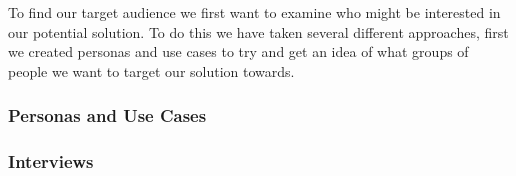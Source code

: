 To find our target audience we first want to examine who might be interested in our potential solution. To do this we have taken several different approaches, first we created personas and use cases to try and get an idea of what groups of people we want to target our solution towards.
\subsubsection{Personas and Use Cases}
\label{UseCases}

\subsubsection{Interviews}
\label{AudInterview}

